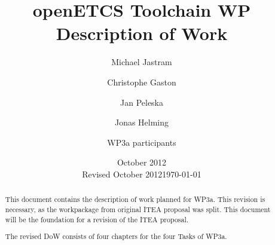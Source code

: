 \documentclass{template/openetcs_article}
\begin{document}
\frontmatter
{}




\title{openETCS Toolchain WP Description of Work}


\date{October 2012\\Revised October 2012}
\date{\today}


\author{Michael Jastram}


\author{Christophe Gaston}

  
\author{Jan Peleska}


\author{Jonas Helming}


\author{WP3a participants}

    



\begin{abstract}
This document contains the description of work planned for WP3a.  This revision is necessary, as the workpackage from original ITEA proposal was split.  This document will be the foundation for a revision of the ITEA proposal.

The revised DoW consists of four chapters for the four Tasks of WP3a.

\end{abstract}

\maketitle
\tableofcontents
\newpage
\end{document}
